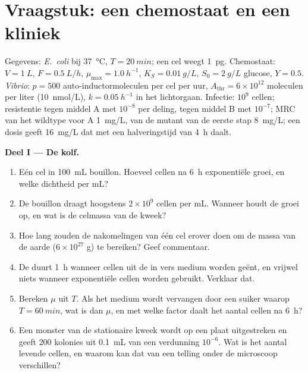 \section{Vraagstuk: een chemostaat en een kliniek}

\begin{problem}
\label{pb:b3:bacteriology:1}
Gegevens: \emph{E.~coli} bij \qty{37}{\celsius}, $T = \qty{20}{min}$;
een cel weegt \qty{1}{pg}. Chemostaat: $V = \qty{1}{L}$,
$F = \qty{0.5}{L/h}$, $\mu_{\max} = \qty{1.0}{h^{-1}}$,
$K_{S} = \qty{0.01}{g/L}$, $S_{0} =
\qty{2}{g/L}$ glucose, $Y = 0.5$. \emph{Vibrio}: $p = 500$
auto-inductormoleculen per cel per uur, $A_{\text{thr}} = 6\times 10^{12}$
moleculen per liter (\qty{10}{nmol/L}), $k = \qty{0.05}{h^{-1}}$ in het
lichtorgaan. Infectie: $10^{9}$ cellen; resistentie tegen middel A met
$10^{-8}$ per deling, tegen middel B met $10^{-7}$; MRC van het
wildtype voor A \qty{1}{mg/L}, van de mutant van de eerste stap
\qty{8}{mg/L}; een dosis geeft \qty{16}{mg/L} dat met een
halveringstijd van \qty{4}{h} daalt.

\medskip
\noindent\textbf{Deel I --- De kolf.}
\begin{enumerate}
  \item Eén cel in \qty{100}{mL} bouillon. Hoeveel cellen na \qty{6}{h}
        exponentiële groei, en welke dichtheid per mL?
  \item De bouillon draagt hoogstens $2\times 10^{9}$ cellen per mL.
        Wanneer houdt de groei op, en wat is de celmassa van de kweek?
  \item Hoe lang zouden de nakomelingen van één cel erover doen om de
        massa van de aarde ($6\times 10^{27}$ g) te bereiken? Geef
        commentaar.
  \item De  duurt \qty{1}{h} wanneer cellen uit de
         in vers medium worden geënt, en vrijwel niets
        wanneer exponentiële cellen worden gebruikt. Verklaar dat.
  \item Bereken $\mu$ uit $T$. Als het medium wordt vervangen door een
        suiker waarop $T = \qty{60}{min}$, wat is dan $\mu$, en met
        welke factor daalt het aantal cellen na \qty{6}{h}?
  \item Een monster van de stationaire kweek wordt op een plaat
        uitgestreken en geeft $200$ kolonies uit \qty{0.1}{mL} van een
        verdunning $10^{-6}$. Wat is het aantal levende cellen, en
        waarom kan dat van een telling onder de microscoop verschillen?
\end{enumerate}


\end{problem}
